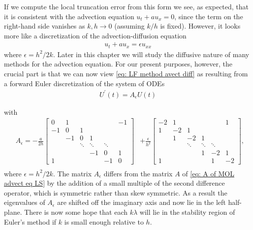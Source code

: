 If we compute the local truncation error from this form we see, as expected, that it is consistent with the advection equation $u_t+a u_x=0$, since the term on the right-hand side vanishes as $k, h \rightarrow 0$ (assuming $k / h$ is fixed). However, it looks more like a discretization of the advection-diffusion equation
\begin{align*}
u_t+a u_x=\epsilon u_{x x}
\end{align*}
where $\epsilon=h^2 / 2 k$.
Later in this chapter we will study the diffusive nature of many methods for the advection equation. For our present purposes, however, the crucial part is that we can now view \eqref{eq: LF method avect diff} as resulting from a forward Euler discretization of the system of ODEs
\begin{align*}
U^{\prime}(t)=A_\epsilon U(t)
\end{align*}

with
\begin{align}
    \label{eq: Aeps LF advect eq}
& A_\epsilon=-\frac{a}{2 h}\left[\begin{array}{cccccc}
0 & 1 & & & & -1 \\
-1 & 0 & 1 & & & \\
& -1 & 0 & 1 & & \\
& & \ddots & \ddots & \ddots & \\
& & & -1 & 0 & 1 \\
1 & & & & -1 & 0
\end{array}\right] & +\frac{\epsilon}{h^2}\left[\begin{array}{cccccc}
-2 & 1 & & & & 1 \\
1 & -2 & 1 & & & \\
& 1 & -2 & 1 & & \\
& & \ddots & \ddots & \ddots & \\
 & & & 1 & -2 & 1 \\
1& & & & 1 & -2
\end{array}\right] \text {, } \\
&
\end{align}
where $\epsilon=h^2 / 2 k$. The matrix $A_\epsilon$ differs from the matrix $A$ of \eqref{eq: A of MOL advect eq LS} by the addition of a small multiple of the second difference operator, which is symmetric rather than skew symmetric. As a result the eigenvalues of $A_\epsilon$ are shifted off the imaginary axis and now lie in the left half-plane. There is now some hope that each $k \lambda$ will lie in the stability region of Euler's method if $k$ is small enough relative to $h$.

